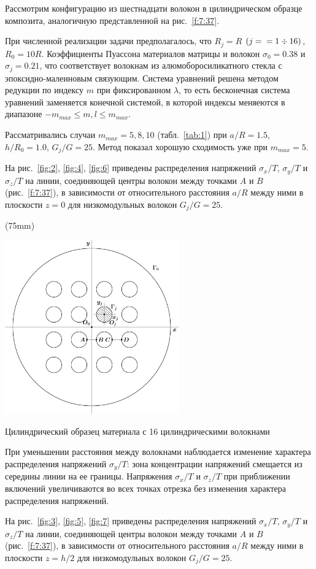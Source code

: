 Рассмотрим конфигурацию из шестнадцати волокон в цилиндрическом образце композита, аналогичную представленной на рис.~\ref{f:7:37}.

При численной реализации задачи предполагалось, что $R_j=R$ $(j=\\=1\div 16)$, $R_0=10R$. Коэффициенты Пуассона материалов матрицы и волокон $\sigma_0=0.38$ и $\sigma_j=0.21$, что соответствует волокнам из алюмоборосиликатного стекла с эпоксидно-малеиновым связующим. Система уравнений решена методом редукции по индексу $m$ при фиксированном $\lambda$, то есть бесконечная система уравнений заменяется конечной системой, в которой индексы меняеются в диапазоне $-m_{max}\le m,l\le m_{max}$.\par\sloppy

Рассматривались случаи $m_{max}=5,8,10$ (табл.~\ref{tab:1}) при $a/R=1.5$, $h/R_0=1.0$, $G_j/G=25$. Метод показал хорошую сходимость уже при $m_{max}=5$.

На рис.~\ref{fig:2}, \ref{fig:4}, \ref{fig:6} приведены распределения напряжений $\sigma_x/T$, $\sigma_y/T$ и $\sigma_z/T$ на линии, соединяющей центры волокон между точками $A$ и $B$ (рис.~\ref{f:7:37}), в зависимости от относительного расстояния $a/R$ между ними в плоскости $z=0$ для низкомодульных волокон $G_j/G=25$.\sloppy

\sidefig*(75mm){
\includegraphics[width=7.5cm]{inc-16.pdf}
\caption{Цилиндрический образец материала с 16 цилиндрическими волокнами}
\label{f:7:37}
}{
При уменьшении расстояния между волокнами наблюдается изменение характера распределения напряжений $\sigma_y/T$: зона концентрации напряжений смещается из середины линии на ее границы. Напряжения $\sigma_x/T$ и $\sigma_z/T$ при приближении включений увеличиваются во всех точках отрезка без изменения характера распределения напряжений.\sloppy

На рис.~\ref{fig:3}, \ref{fig:5}, \ref{fig:7} приведены распределения напряжений $\sigma_x/T$, $\sigma_y/T$ и $\sigma_z/T$ на линии, соединяющей центры волокон между точками $A$ и $B$ (рис.~\ref{f:7:37}), в зависимости от относительного расстояния $a/R$ между ними в плоскости $z=h/2$ для низкомодульных волокон $G_j/G=25$.}

